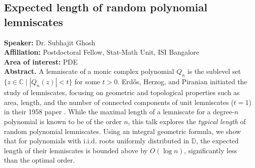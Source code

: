 \subsection*{Expected length of random polynomial lemniscates} %
\noindent
\textbf{Speaker:} Dr. Subhajit Ghosh \\ %
\textbf{Affiliation:} Postdoctoral Fellow, Stat-Math Unit, ISI Bangalore \\ %
\textbf{Area of interest:} PDE \\

\noindent\textbf{Abstract.}  A lemniscate of a monic complex polynomial \( Q_n \) is the sublevel set \( \{z \in \mathbb{C} \mid |Q_n(z)| < t\} \) for some \( t > 0 \). Erdős, Herzog, and Piranian initiated the study of lemniscates, focusing on geometric and topological properties such as area, length, and the number of connected components of unit lemniscates (\( t = 1 \)) in their 1958 paper \cite{metricEHP}. While the maximal length of a lemniscate for a degree-\( n \) polynomial is known to be of the order \( n \), this talk explores the \emph{typical length} of random polynomial lemniscates. Using an integral geometric formula, we show that for polynomials with i.i.d. roots uniformly distributed in \( \mathbb{D} \), the expected length of their lemniscates is bounded above by \( O(\log n) \), significantly less than the optimal order.


